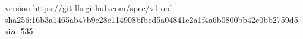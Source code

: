 version https://git-lfs.github.com/spec/v1
oid sha256:16b3a1465ab47b9e28e114908bfbcd5a04841e2a1f4a6b0800bb42c0bb2759d5
size 535
